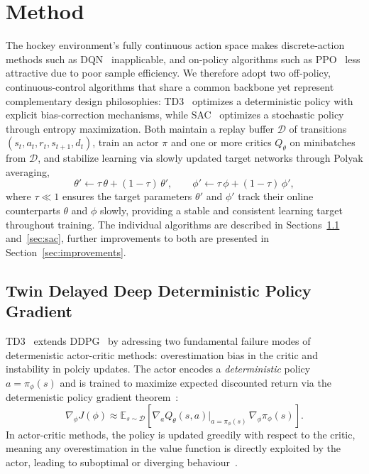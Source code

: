 \section{Method}\label{sec:method}

The hockey environment's fully continuous action space makes discrete-action methods such as
\ac{DQN}~\cite{mnih2015human:DQN} inapplicable, and on-policy algorithms such as
\ac{PPO}~\cite{SchulmanEtAl2017:PPO} less attractive due to poor sample efficiency.
We therefore adopt two off-policy, continuous-control algorithms that share a common backbone
yet represent complementary design philosophies: \ac{TD3}~\cite{fujimoto2018:TD3} optimizes a
deterministic policy with explicit bias-correction mechanisms, while \ac{SAC}~\cite{haarnoja2018:SOFT}
optimizes a stochastic policy through entropy maximization.
Both maintain a replay buffer $\mathcal{D}$ of transitions $(s_t, a_t, r_t, s_{t+1}, d_t)$,
train an actor $\pi$ and one or more critics $Q_\theta$ on minibatches from $\mathcal{D}$, and
stabilize learning via slowly updated target networks through Polyak averaging,
\begin{equation}
  \theta' \leftarrow \tau\,\theta + (1-\tau)\,\theta', \qquad
  \phi'   \leftarrow \tau\,\phi  + (1-\tau)\,\phi',
  \label{eq:polyak}
\end{equation}
where $\tau \ll 1$ ensures the target parameters $\theta'$ and $\phi'$ track their online
counterparts $\theta$ and $\phi$ slowly, providing a stable and consistent learning target
throughout training.
The individual algorithms are described in Sections~\ref{sec:td3} and~\ref{sec:sac},
further improvements to both are presented in Section~\ref{sec:improvements}.


\subsection{Twin Delayed Deep Deterministic Policy Gradient}
\label{sec:td3}

\ac{TD3}~\cite{fujimoto2018:TD3} extends \ac{DDPG}~\cite{lillicrap2015:DDPG} by adressing two 
fundamental failure modes of determenistic actor-critic methods:
overestimation bias in the critic and instability in polciy updates.
The actor encodes a \emph{deterministic} policy $a = \pi_\phi(s)$ and is trained to maximize 
expected discounted return via the determenistic policy gradient theorem~\cite{silver2014:DPG}:
\begin{equation}
  \nabla_\phi J(\phi)
    \approx \mathbb{E}_{s \sim \mathcal{D}}\!\left[
      \nabla_a Q_{\theta}(s,a)\big|_{a=\pi_\phi(s)}\,
      \nabla_\phi \pi_\phi(s)
    \right].
\end{equation}
In actor-critic methods, the policy is updated greedily with respect to the critic,
meaning any overestimation in the value function is directly exploited by the actor,
leading to suboptimal or diverging behaviour~\cite{fujimoto2018:TD3}.

